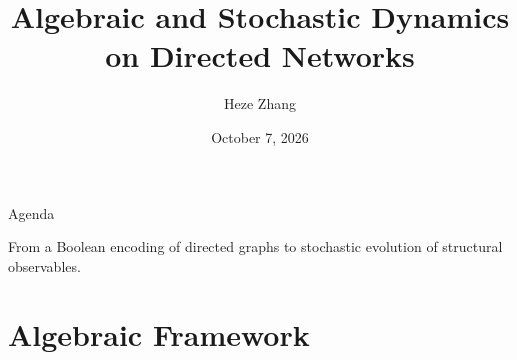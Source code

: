 \documentclass[11pt]{beamer}
\title[Algebraic \& Dynamics on Networks]{Algebraic and Stochastic Dynamics on Directed Networks}
\author[H. Zhang]{Heze Zhang}
\date{October 7, 2026}
\begin{document}
\begin{frame}
  \titlepage
\end{frame}

\begin{frame}{Agenda}
  \vspace{0.35cm}
  \tableofcontents[hideallsubsections]

  \vfill
  {\small\color{softgray}
  From a Boolean encoding of directed graphs to stochastic evolution of structural observables.}
  \vspace{0.35cm}
\end{frame}

\section{Algebraic Framework}
\end{document}
